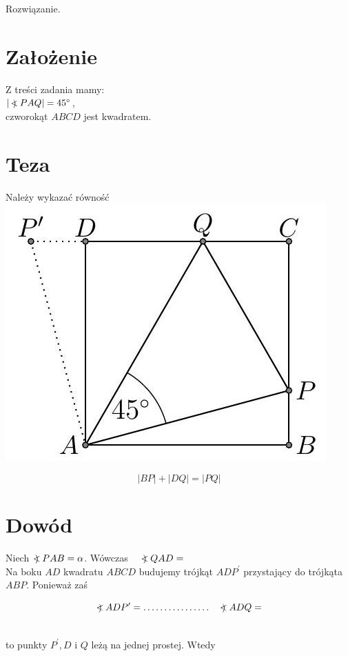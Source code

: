 \documentclass[10pt]{article}
\newcommand\Varangle{\mathop{{<\!\!\!\!\!\text{\small)}}\:}\nolimits}
\begin{document}
Rozwiązanie.

\section*{Założenie}
Z treści zadania mamy:\\
\(|\Varangle P A Q|=45^{\circ}\),\\
czworokąt \(A B C D\) jest kwadratem.

\section*{Teza}
Należy wykazać równość\\
\includegraphics[max width=\textwidth, center]{2024_11_21_71f62bd117d375398909g-057(1)}

\[
|B P|+|D Q|=|P Q|
\]

\section*{Dowód}
Niech \(\Varangle P A B=\alpha\). Wówczas \(\quad \Varangle Q A D=\) \(\qquad\)\\
Na boku \(A D\) kwadratu \(A B C D\) budujemy trójkąt \(A D P^{\prime}\) przystający do trójkąta \(A B P\). Ponieważ zaś

\[
\Varangle A D P^{\prime}=\ldots \ldots \ldots \ldots \ldots . \quad \Varangle A D Q=
\]

\(\qquad\)\\
to punkty \(P^{\prime}, D\) i \(Q\) leżą na jednej prostej. Wtedy
\end{document}

